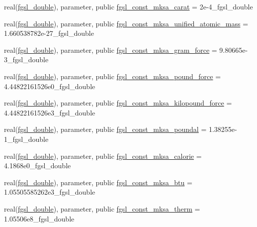 \begin{DoxyCompactItemize}
\item 
real(\hyperlink{namespacefgsl_a9af5113378e0f000eb479d3f90196ddf}{fgsl\+\_\+double}), parameter, public \hyperlink{namespacefgsl_ab0deb9fa34a456a2db1c8833499c5b2f}{fgsl\+\_\+const\+\_\+mksa\+\_\+carat} = 2e-\/4\+\_\+fgsl\+\_\+double
\item 
real(\hyperlink{namespacefgsl_a9af5113378e0f000eb479d3f90196ddf}{fgsl\+\_\+double}), parameter, public \hyperlink{namespacefgsl_a0e18a0c505ad7f70865f8d0351dbec24}{fgsl\+\_\+const\+\_\+mksa\+\_\+unified\+\_\+atomic\+\_\+mass} = 1.\+660538782e-\/27\+\_\+fgsl\+\_\+double
\item 
real(\hyperlink{namespacefgsl_a9af5113378e0f000eb479d3f90196ddf}{fgsl\+\_\+double}), parameter, public \hyperlink{namespacefgsl_ac3e7e21c6fe9874df8a9b7583e343e76}{fgsl\+\_\+const\+\_\+mksa\+\_\+gram\+\_\+force} = 9.\+80665e-\/3\+\_\+fgsl\+\_\+double
\item 
real(\hyperlink{namespacefgsl_a9af5113378e0f000eb479d3f90196ddf}{fgsl\+\_\+double}), parameter, public \hyperlink{namespacefgsl_af568f44c87cf706dcc1fe887c5a68604}{fgsl\+\_\+const\+\_\+mksa\+\_\+pound\+\_\+force} = 4.\+44822161526e0\+\_\+fgsl\+\_\+double
\item 
real(\hyperlink{namespacefgsl_a9af5113378e0f000eb479d3f90196ddf}{fgsl\+\_\+double}), parameter, public \hyperlink{namespacefgsl_a7c76b512b50dc8300612e051816e5ede}{fgsl\+\_\+const\+\_\+mksa\+\_\+kilopound\+\_\+force} = 4.\+44822161526e3\+\_\+fgsl\+\_\+double
\item 
real(\hyperlink{namespacefgsl_a9af5113378e0f000eb479d3f90196ddf}{fgsl\+\_\+double}), parameter, public \hyperlink{namespacefgsl_a6679d0f4bba1852ff847f920c8f8ad2b}{fgsl\+\_\+const\+\_\+mksa\+\_\+poundal} = 1.\+38255e-\/1\+\_\+fgsl\+\_\+double
\item 
real(\hyperlink{namespacefgsl_a9af5113378e0f000eb479d3f90196ddf}{fgsl\+\_\+double}), parameter, public \hyperlink{namespacefgsl_acb71a08b4387dc29400805067d9aa6ec}{fgsl\+\_\+const\+\_\+mksa\+\_\+calorie} = 4.\+1868e0\+\_\+fgsl\+\_\+double
\item 
real(\hyperlink{namespacefgsl_a9af5113378e0f000eb479d3f90196ddf}{fgsl\+\_\+double}), parameter, public \hyperlink{namespacefgsl_a868742553429b50b469d7d21a481cc66}{fgsl\+\_\+const\+\_\+mksa\+\_\+btu} = 1.\+05505585262e3\+\_\+fgsl\+\_\+double
\item 
real(\hyperlink{namespacefgsl_a9af5113378e0f000eb479d3f90196ddf}{fgsl\+\_\+double}), parameter, public \hyperlink{namespacefgsl_ae80985230902a792be876b10eac1a358}{fgsl\+\_\+const\+\_\+mksa\+\_\+therm} = 1.\+05506e8\+\_\+fgsl\+\_\+double

\end{DoxyCompactItemize}
